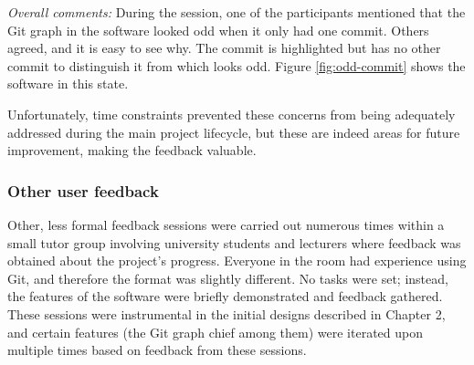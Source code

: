 \noindent \emph{Overall comments:}
During the session, one of the participants mentioned that the Git graph in the software looked odd when it only had one commit. Others agreed, and it is easy to see why. The commit is highlighted but has no other commit to distinguish it from which looks odd. Figure \ref{fig:odd-commit} shows the software in this state.


Unfortunately, time constraints prevented these concerns from being adequately addressed during the main project lifecycle, but these are indeed areas for future improvement, making the feedback valuable.

\subsubsection{Other user feedback}

Other, less formal feedback sessions were carried out numerous times within a small tutor group involving university students and lecturers where feedback was obtained about the project's progress. Everyone in the room had experience using Git, and therefore the format was slightly different. No tasks were set; instead, the features of the software were briefly demonstrated and feedback gathered. These sessions were instrumental in the initial designs described in Chapter 2, and certain features (the Git graph chief among them) were iterated upon multiple times based on feedback from these sessions.

